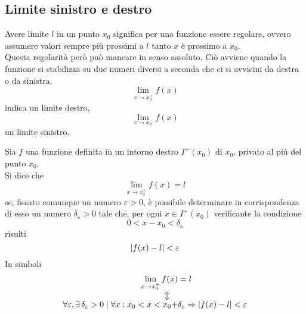 \subsection{Limite sinistro e destro}
Avere limite $l$ in un punto $x_0$ significa per una funzione essere regolare, ovvero assumere valori
sempre più prossimi a $l$ tanto $x$ è prossimo a $x_0$.\\
Questa regolarità però può mancare in senso assoluto. Ciò avviene quando la funzione si stabilizza
su due numeri diversi a seconda che ci si avvicini da destra o da sinistra.
\begin{equation*}
  \lim\limits_{x\to x_0^+}f(x)
\end{equation*}
indica un limite destro,
\begin{equation*}
  \lim\limits_{x\to x_0^-}f(x)
\end{equation*}
un limite sinistro.
\begin{definizioneLimiteFinitoDestro}
  Sia $f$ una funzione definita in un intorno destro $I^+(x_0)$ di $x_0$, privato al più del punto
  $x_0$.\\
  Si dice che
  \begin{equation*}
    \lim\limits_{x\to x_0^+}f(x) = l
  \end{equation*}
  se, fissato comunque un numero $\varepsilon>0$, è possibile determinare in corrispondenza di esso
  un numero $\delta_\varepsilon>0$ tale che, per ogni $x\in I^+(x_0)$ verificante la condizione
  \begin{equation*}
    0<x-x_0<\delta_\varepsilon
  \end{equation*}
  risulti
  \begin{equation*}
    \lvert f(x)-l\rvert<\varepsilon
  \end{equation*}
  In simboli
  \begin{align*}
    \lim\limits_{x\to x_0^+} f(x) &= l\\
    \ArrowBetweenLines
    \forall \varepsilon, \exists\,\delta_\varepsilon>0\mid\forall x: x_0< x <x_0+&\delta_\varepsilon 
    \Rightarrow \vert f(x) - l\vert < \varepsilon
  \end{align*}
\end{definizioneLimiteFinitoDestro}
